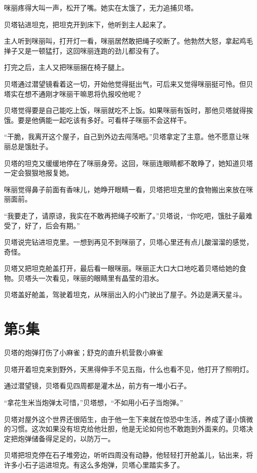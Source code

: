 \documentclass[a4paper,12pt,UTF8,twoside]{ctexbook}
\begin{document}
咪丽疼得大叫一声，松开了嘴。她实在太饿了，无力追捕贝塔。

贝塔钻进坦克，把坦克开到床下，他听到主人起来了。

主人听到咪丽叫，打开灯一看，咪丽居然敢把绳子咬断了。他勃然大怒，拿起鸡毛掸子又是一顿猛打，这回咪丽连跑的劲儿都没有了。

打完之后，主人又把咪丽捆在椅子腿上。

贝塔通过潜望镜看着这一切，开始他觉得挺出气，可后来又觉得咪丽挺可怜。但贝塔实在想不通刚才咪丽干嘛恩将仇报咬他呢？

贝塔觉得要是自己能吃上饭，咪丽就吃不上饭。如果咪丽有饭时，那他贝塔就得挨饿。要是他俩能一起吃该有多好。可看样子咪丽不会这样干。

“干脆，我离开这个屋子，自己到外边去闯荡吧。”贝塔拿定了主意。他不愿意让咪丽总是饿肚子。

贝塔的坦克又缓缓地停在了咪丽身旁。这回，咪丽连眼睛都不敢睁了，她知道贝塔一定会狠狠地报复她。

咪丽觉得鼻子前面有香味儿，她睁开眼睛一看，贝塔把坦克里的食物搬出来放在咪丽面前。

“我要走了，请原谅，我实在不敢再把绳子咬断了。”贝塔说，“你吃吧，饿肚子最难受了，好了，后会有期。”

贝塔说完钻进坦克里。一想到再见不到咪丽了，贝塔心里还有点儿酸溜溜的感觉，奇怪。

贝塔又把坦克舱盖打开，最后看一眼咪丽。咪丽正大口大口地吃着贝塔给她的食物。贝塔头一次看见，咪丽的眼睛里有晶莹的泪水。

贝塔盖好舱盖，驾驶着坦克，从咪丽出入的小门驶出了屋子。外边是满天星斗。

\chapter{第5集}

贝塔的炮弹打伤了小麻雀；舒克的直升机营救小麻雀

贝塔开着坦克来到野外，天黑得伸手不见五指，什么也看不见，他打开了照明灯。

通过潜望镜，贝塔看见四周都是灌木丛，前方有一堆小石子。

“拿花生米当炮弹太可惜，”贝塔想，“不如用小石子当炮弹。”

贝塔对屋外这个世界还很陌生，由于他一生下来就在惊恐中生活，养成了谨小慎微的习惯。这次如果没有坦克给他壮胆，他是无论如何也不敢跑到外面来的。贝塔决定把炮弹储备得足足的，以防万一。

贝塔把坦克停在石子堆旁边，听听四周没有动静，他轻轻打开舱盖儿，钻出来，将许多小石子运进坦克。有这么多炮弹，贝塔心里踏实多了。
\end{document}
